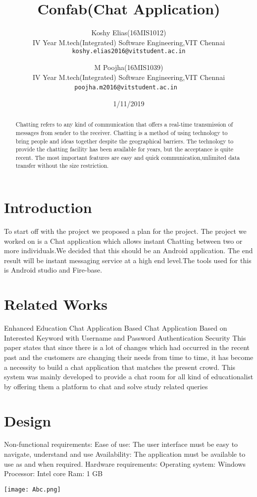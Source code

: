 \documentclass{article}
\begin{document}
\title{Confab(Chat Application)}
\author{
  Koshy Elias(16MIS1012)\\
  IV Year M.tech(Integrated) Software Engineering,VIT Chennai\\
  \texttt{koshy.elias2016@vitstudent.ac.in}
  \and
  M Poojha(16MIS1039)\\
  IV Year M.tech(Integrated) Software Engineering,VIT Chennai\\
  \texttt{poojha.m2016@vitstudent.ac.in}
  \
}
\date{1/11/2019}
\maketitle 
\begin{abstract}
Chatting refers to any kind of communication that offers a real-time transmission of messages from sender to the receiver. Chatting is a method of using technology to bring people and ideas together despite the geographical barriers. The technology to provide the chatting facility has been available for years, but the acceptance is quite recent. The most important features are easy and quick communication,unlimited data transfer without the size restriction.

\end{abstract}
\section{Introduction}
To start off with the project we proposed a plan for the project. The project we worked on is a Chat application which allows instant Chatting between two or more individuals.We decided that this should be an Android application. The end result will be instant messaging service at a high end level.The tools used for this is Android studio and Fire-base.
\section{Related Works}
Enhanced Education Chat Application Based Chat
Application Based on Interested Keyword with Username
and Password Authentication Security
This paper states that since there is a lot of changes which
had occurred in the recent past and the customers are changing
their needs from time to time, it has become a necessity to
build a chat application that matches the present crowd. This
system was mainly developed to provide a chat room for all
kind of educationalist by offering them a platform to chat and
solve study related queries
\cite{https://ieeexplore.ieee.org/document/8370395}
\section{Design}
Non-functional requirements:
Ease of use: The user interface must be easy to navigate, understand and use
Availability: The application must be available to use as and when required.
Hardware requirements:
Operating system: Windows
Processor: Intel core
Ram: 1 GB
\begin{center}
\texttt{[image: Abc.png]}
\end{center}
\end{document}
